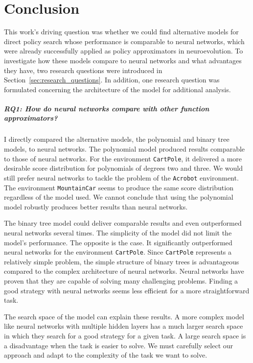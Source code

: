
\chapter{Conclusion}
\label{ch:conclusions}

This work's driving question was whether we could find alternative models for direct policy search whose performance is comparable to neural networks, which were already successfully applied as policy approximators in neuroevolution. To investigate how these models compare to neural networks and what advantages they have, two research questions were introduced in Section~\ref{sec:research_questions}. In addition, one research question was formulated concerning the architecture of the model for additional analysis.

\paragraph*{RQ1: How do neural networks compare with other function approximators?} I directly compared the alternative models, the polynomial and binary tree models, to neural networks. The polynomial model produced results comparable to those of neural networks. For the environment \verb|CartPole|, it delivered a more desirable score distribution for polynomials of degrees two and three. We would still prefer neural networks to tackle the problem of the \verb|Acrobot| environment. The environment \verb|MountainCar| seems to produce the same score distribution regardless of the model used. We cannot conclude that using the polynomial model robustly produces better results than neural networks.

The binary tree model could deliver comparable results and even outperformed neural networks several times. The simplicity of the model did not limit the model's performance. The opposite is the case. It significantly outperformed neural networks for the environment \verb|CartPole|. Since \verb|CartPole| represents a relatively simple problem, the simple structure of binary trees is advantageous compared to the complex architecture of neural networks. Neural networks have proven that they are capable of solving many challenging problems. Finding a good strategy with neural networks seems less efficient for a more straightforward task.

The search space of the model can explain these results. A more complex model like neural networks with multiple hidden layers has a much larger search space in which they search for a good strategy for a given task. A large search space is a disadvantage when the task is easier to solve. We must carefully select our approach and adapt to the complexity of the task we want to solve.

